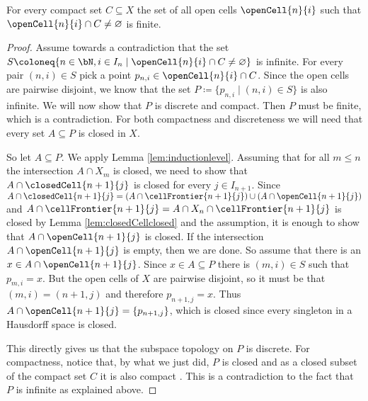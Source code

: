 \begin{lem} \label{lem:compactintersectsonlyfinite}
    For every compact set $C \subseteq X$ the set of all open cells $\openCell{n}{i}$ such that $\openCell{n}{i} \cap C \ne \varnothing$ is finite. \href{https://github.com/scholzhannah/CWComplexes/blob/7be4872a05b534011cc969eb5b80a4b7f0bf57e2/CWcomplexes/Lemmas.lean#L111-L214}{\faExternalLink}
\end{lem}
\begin{proof}
    Assume towards a contradiction that the set $S \coloneq \{n \in \bN, i \in I_n \mid \openCell{n}{i} \cap C \ne \varnothing \}$ is infinite. 
    For every pair $(n, i) \in S$ pick a point $p_{n, i} \in \openCell{n}{i} \cap C$. 
    Since the open cells are pairwise disjoint, we know that the set $P \coloneq \{p_{n, i} \mid (n, i) \in S\}$ is also infinite.
    We will now show that $P$ is discrete and compact. 
    Then $P$ must be finite, which is a contradiction.
    For both compactness and discreteness we will need that every set $A \subseteq P$ is closed in $X$.

    So let $A \subseteq P$. 
    We apply Lemma \ref{lem:inductionlevel}. 
    Assuming that for all $m \le n$ the intersection $A \cap X_m$ is closed, we need to show that $A \cap \closedCell{n + 1}{j}$ is closed for every $j \in I_{n + 1}$.
    Since $A \cap \closedCell{n + 1}{j} = (A \cap \cellFrontier{n + 1}{j}) \cup (A \cap \openCell{n + 1}{j})$ and $A \cap \cellFrontier{n + 1}{j} = A \cap X_{n} \cap \cellFrontier{n + 1}{j}$ is closed by Lemma \ref{lem:closedCellclosed} and the assumption, it is enough to show that $A \cap \openCell{n + 1}{j}$ is closed. 
    If the intersection $A \cap \openCell{n + 1}{j}$ is empty, then we are done. 
    So assume that there is an $x \in A \cap \openCell{n + 1}{j}$. 
    Since $x \in A \subseteq P$ there is $(m, i) \in S$ such that $p_{m, i} = x$. 
    But the open cells of $X$ are pairwise disjoint, so it must be that $(m, i) = (n + 1, j)$ and therefore $p_{n + 1, j} = x$. 
    Thus $A \cap \openCell{n + 1}{j} = \{p_{n + 1, j}\}$, which is closed since every singleton in a Hausdorff space is closed. 

    This directly gives us that the subspace topology on $P$ is discrete. 
    For compactness, notice that, by what we just did, $P$ is closed and as a closed subset of the compact set $C$ it is also compact
    \href{https://github.com/leanprover-community/mathlib4/blob/93828f4cd10fb8cab31700b110fd2751d36bf1b8/Mathlib/Topology/Compactness/Compact.lean#L92-L95}{\faExternalLink}. 
    This is a contradiction to the fact that $P$ is infinite as explained above. 
\end{proof}

